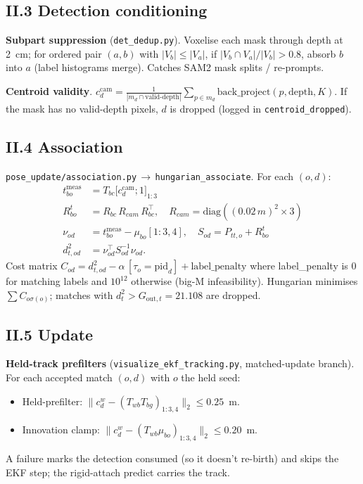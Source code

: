 \documentclass[11pt]{article}
\newcommand{\file}[1]{\texttt{#1}}
\begin{document}
\subsection*{II.3 Detection conditioning}

\textbf{Subpart suppression} (\file{det\_dedup.py}).
Voxelise each mask through depth at 2~cm; for ordered pair $(a,b)$
with $|V_b|\le|V_a|$, if $|V_b\cap V_a|/|V_b|>0.8$, absorb $b$ into $a$
(label histograms merge). Catches SAM2 mask splits / re-prompts.

\textbf{Centroid validity}.
$c_d^{\text{cam}} = \frac{1}{|m_d\cap\text{valid-depth}|}\sum_{p\in m_d}\mathrm{back\_project}(p,\mathrm{depth},K)$.
If the mask has no valid-depth pixels, $d$ is dropped (logged in
\texttt{centroid\_dropped}).

\subsection*{II.4 Association}

\file{pose\_update/association.py}\,$\to$\,\texttt{hungarian\_associate}.
For each $(o,d)$:
\begin{align*}
  t_{bo}^{\text{meas}} &= T_{bc}\bigl[c_d^{\text{cam}}; 1\bigr]_{1:3} \\
  R_{bo}^t &= R_{bc}\,R_{cam}\,R_{bc}^\top, \quad R_{cam} = \mathrm{diag}((0.02\,m)^2{\times}3) \\
  \nu_{od} &= t_{bo}^{\text{meas}} - \mu_{bo}[1{:}3, 4],\quad
  S_{od} = P_{tt,o} + R_{bo}^t \\
  d^2_{t,od} &= \nu_{od}^\top S_{od}^{-1} \nu_{od}.
\end{align*}
Cost matrix $C_{od} = d^2_{t,od} - \alpha\,[\tau_o = \mathrm{pid}_d] + \mathrm{label\_penalty}$ where
label\_penalty is $0$ for matching labels and $10^{12}$ otherwise
(big-M infeasibility). Hungarian minimises $\sum C_{o\sigma(o)}$;
matches with $d^2_t > G_{\text{out},t}=21.108$ are dropped.

\subsection*{II.5 Update}

\textbf{Held-track prefilters} (\file{visualize\_ekf\_tracking.py},
matched-update branch). For each accepted match $(o,d)$ with $o$ the
held seed:
\begin{itemize}
\item Held-prefilter: $\|c_d^w - (T_{wb}T_{bg})_{1:3,4}\|_2 \le 0.25$~m.
\item Innovation clamp: $\|c_d^w - (T_{wb}\mu_{bo})_{1:3,4}\|_2 \le 0.20$~m.
\end{itemize}
A failure marks the detection consumed (so it doesn't re-birth) and
skips the EKF step; the rigid-attach predict carries the track.
\end{document}
